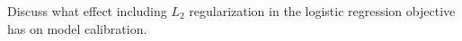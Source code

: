 \item {}
Discuss what effect including $L_2$ regularization in the logistic regression
objective has on model calibration.

\ifnum{} {
  
} \fi
